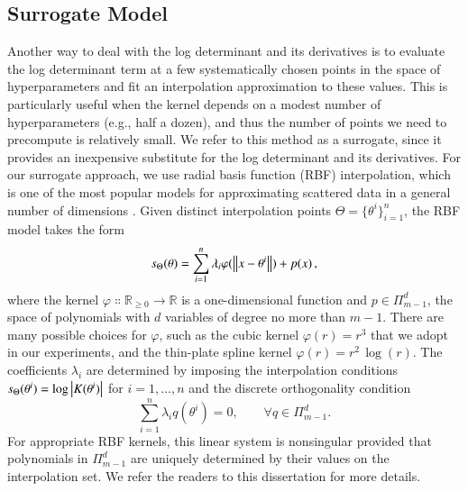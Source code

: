 \subsection{Surrogate Model}\label{sgpsec:rbf}

Another way to deal with the log determinant and its derivatives is to evaluate
the log determinant term at a few systematically chosen points in the space of
hyperparameters and fit an interpolation approximation to these values.  This
is particularly useful when the kernel depends on a modest number of
hyperparameters (e.g., half a dozen), and thus the number of points we need to
precompute is relatively small. We refer to this method as a surrogate, since it
provides an inexpensive substitute for the log determinant and its derivatives.
For our surrogate approach, we use radial basis function (RBF) interpolation,
which is one of the most popular models for approximating scattered data in a
general number of dimensions \citep{buhmann2000radial,fasshauer2007meshfree,
schaback2006kernel,wendland2004scattered}.
Given distinct interpolation points $\Theta=\{\theta^i\}_{i=1}^n$, the RBF model
takes the form
\begin{equation}\label{eq:rbf}
  s_{\Theta}(\theta) = \sum_{i=1}^n \lambda_i \varphi(\left\lVert x - \theta^i\right\rVert) + p
  (x)\,,
\end{equation}
where the kernel $\varphi\Colon\mathbb{R}_{\geq 0} \to \mathbb{R}$ is a
one\hyp{}dimensional function and $p \in \Pi_{m-1}^d$, the space of polynomials
with $d$ variables of degree no more than $m-1$. There are many possible choices
for $\varphi$, such as the cubic kernel $\varphi(r)=r^3$ that we adopt in our
experiments, and the thin-plate spline kernel $\varphi(r)=r^2\,\log(r)$. The
coefficients $\lambda_i$ are determined by imposing the interpolation conditions
$s_{\Theta}(\theta^i) = \log\left\lvert K(\theta^i)\right\rvert$ for $i=1,\ldots,n$ and the
discrete orthogonality condition
\begin{equation}\label{eq:disc_orthg}
  \sum_{i=1}^n \lambda_i q(\theta^i) = 0, \qquad \forall q \in \Pi_{m-1}^d.
\end{equation}
For appropriate RBF kernels, this linear system is nonsingular provided that
polynomials in $\Pi_{m-1}^d$ are uniquely determined by their values on the
interpolation set. We refer the readers to this dissertation
\cite{eriksson2018scalable} for more details.